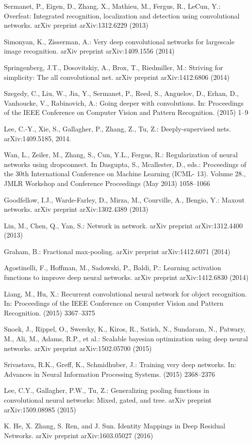 \documentclass[10pt,twocolumn,letterpaper]{article}
\begin{document}
{\begin{thebibliography}{9}
\bibitem{[14]}
Sermanet, P., Eigen, D., Zhang, X., Mathieu, M., Fergus, R., LeCun, Y.:
Overfeat: Integrated recognition, localization and detection using convolutional
networks. arXiv preprint arXiv:1312.6229 (2013)

\bibitem{[15]}
Simonyan, K., Zisserman, A.: Very deep convolutional networks for largescale
image recognition. arXiv preprint arXiv:1409.1556 (2014)

\bibitem{[16]}
Springenberg, J.T., Dosovitskiy, A., Brox, T., Riedmiller, M.: Striving for
simplicity: The all convolutional net. arXiv preprint arXiv:1412.6806 (2014)

\bibitem{[17]}
Szegedy, C., Liu, W., Jia, Y., Sermanet, P., Reed, S., Anguelov, D., Erhan,
D., Vanhoucke, V., Rabinovich, A.: Going deeper with convolutions.
In: Proceedings of the IEEE Conference on Computer Vision and Pattern
Recognition. (2015) 1–9

\bibitem{[18]}
Lee, C.-Y., Xie, S., Gallagher, P., Zhang, Z., Tu, Z.: Deeply-supervised
nets. arXiv:1409.5185, 2014.

\bibitem{[19]}
Wan, L., Zeiler, M., Zhang, S., Cun, Y.L., Fergus, R.: Regularization of neural
networks using dropconnect. In Dasgupta, S., Mcallester, D., eds.: Proceedings
of the 30th International Conference on Machine Learning (ICML-
13). Volume 28., JMLR Workshop and Conference Proceedings (May 2013)
1058–1066

\bibitem{[20]}
Goodfellow, I.J., Warde-Farley, D., Mirza, M., Courville, A., Bengio, Y.:
Maxout networks. arXiv preprint arXiv:1302.4389 (2013)

\bibitem{[21]}
Lin, M., Chen, Q., Yan, S.: Network in network. arXiv preprint
arXiv:1312.4400 (2013)

\bibitem{[22]}
Graham, B.: Fractional max-pooling. arXiv preprint arXiv:1412.6071 (2014)

\bibitem{[23]}
Agostinelli, F., Hoffman, M., Sadowski, P., Baldi, P.: Learning activation
functions to improve deep neural networks. arXiv preprint arXiv:1412.6830
(2014)

\bibitem{[24]}
Liang, M., Hu, X.: Recurrent convolutional neural network for object recognition.
In: Proceedings of the IEEE Conference on Computer Vision and
Pattern Recognition. (2015) 3367–3375

\bibitem{[25]}
Snoek, J., Rippel, O., Swersky, K., Kiros, R., Satish, N., Sundaram, N.,
Patwary, M., Ali, M., Adams, R.P., et al.: Scalable bayesian optimization
using deep neural networks. arXiv preprint arXiv:1502.05700 (2015)

\bibitem{[26]}
Srivastava, R.K., Greff, K., Schmidhuber, J.: Training very deep networks.
In: Advances in Neural Information Processing Systems. (2015) 2368–2376

\bibitem{[27]}
Lee, C.Y., Gallagher, P.W., Tu, Z.: Generalizing pooling functions in
convolutional neural networks: Mixed, gated, and tree. arXiv preprint
arXiv:1509.08985 (2015)

\bibitem{[32]}
K. He, X. Zhang, S. Ren, and J. Sun. Identity Mappings in Deep Residual Networks.  arXiv preprint arXiv:1603.05027 (2016)


\end{thebibliography}
}
\end{document}

